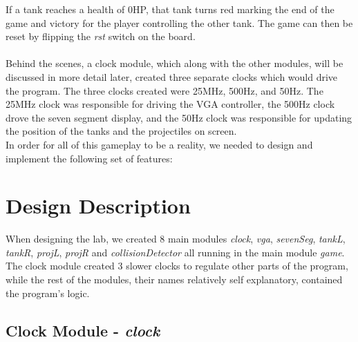 \documentclass{article}
\begin{document}
If a tank reaches a health of 0HP, that tank turns red marking the end of the game and victory for the player controlling the other tank.  The game can then be reset by flipping the \textit{rst} switch on the board.
\\
\\
Behind the scenes, a clock module, which along with the other modules, will be discussed in more detail later, created three separate clocks which would drive the program.  The three clocks created were 25MHz, 500Hz, and 50Hz.  The 25MHz clock was responsible for driving the VGA controller, the 500Hz clock drove the seven segment display, and the 50Hz clock was responsible for updating the position of the tanks and the projectiles on screen. 
\\

In order for all of this gameplay to be a reality, we needed to design and implement the following set of features:
 

\section*{Design Description}



When designing the lab, we created 8 main modules \textit{clock}, \textit{vga}, \textit{sevenSeg}, \textit{tankL}, \textit{tankR}, \textit{projL}, \textit{projR} and \textit{collisionDetector} all running in the main module \textit{game}.  The clock module created 3 slower clocks to regulate other parts of the program, while the rest of the modules, their names relatively self explanatory, contained the program's logic.

\subsection*{Clock Module - \textit{clock}}
\end{document}
